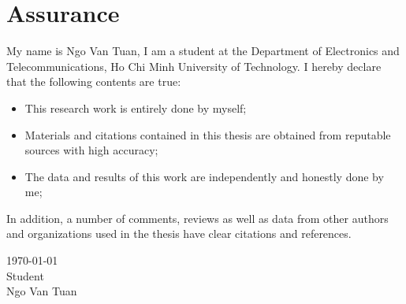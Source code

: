 \documentclass[\main/main.tex]{subfiles}
\begin{document}
\graphicspath{{imgs/}{00_misc/imgs/}}

\chapter*{Assurance}

My name is Ngo Van Tuan, I am a student at the Department of Electronics and Telecommunications, Ho Chi Minh University of Technology.
\newline\newline
I hereby declare that the following contents are true:
\begin{itemize}
    \item This research work is entirely done by myself;
    \item Materials and citations contained in this thesis are obtained from reputable sources with high accuracy;
    \item The data and results of this work are independently and honestly done by me;
\end{itemize}

In addition, a number of comments, reviews as well as data from other authors and organizations used in the thesis have clear citations and references.

\begin{flushright}
    \parbox[t][4cm]{8cm}
    {   \centering
        \today\\
        Student\\
        \vspace{2cm}
        Ngo Van Tuan
    }
\end{flushright}
\end{document}
